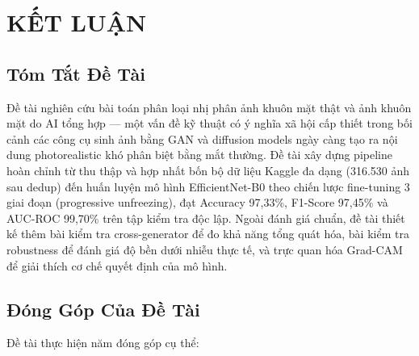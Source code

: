 \chapter{KẾT LUẬN}

\section{Tóm Tắt Đề Tài}

Đề tài nghiên cứu bài toán phân loại nhị phân ảnh khuôn mặt thật và ảnh khuôn mặt do AI tổng hợp --- một vấn đề kỹ thuật có ý nghĩa xã hội cấp thiết trong bối cảnh các công cụ sinh ảnh bằng GAN và diffusion models ngày càng tạo ra nội dung photorealistic khó phân biệt bằng mắt thường. Đề tài xây dựng pipeline hoàn chỉnh từ thu thập và hợp nhất bốn bộ dữ liệu Kaggle đa dạng (316.530 ảnh sau dedup) đến huấn luyện mô hình EfficientNet-B0 \cite{tan2019efficientnet} theo chiến lược fine-tuning 3 giai đoạn (progressive unfreezing), đạt Accuracy 97,33\%, F1-Score 97,45\% và AUC-ROC 99,70\% trên tập kiểm tra độc lập. Ngoài đánh giá chuẩn, đề tài thiết kế thêm bài kiểm tra cross-generator để đo khả năng tổng quát hóa, bài kiểm tra robustness để đánh giá độ bền dưới nhiễu thực tế, và trực quan hóa Grad-CAM \cite{selvaraju2017gradcam} để giải thích cơ chế quyết định của mô hình.

\section{Đóng Góp Của Đề Tài}

Đề tài thực hiện năm đóng góp cụ thể:


